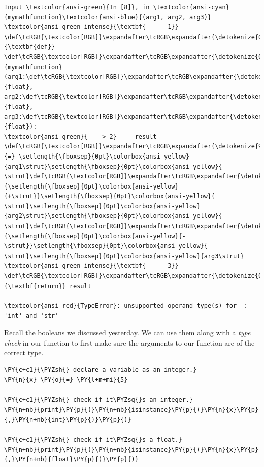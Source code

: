 \begin{Verbatim}[commandchars=\\\{\}, frame=single, framerule=2mm, rulecolor=\color{outerrorbackground}]
Input \textcolor{ansi-green}{In [8]}, in \textcolor{ansi-cyan}{mymathfunction}\textcolor{ansi-blue}{(arg1, arg2, arg3)}
\textcolor{ansi-green-intense}{\textbf{      1}} \def\tcRGB{\textcolor[RGB]}\expandafter\tcRGB\expandafter{\detokenize{0,135,0}}{\textbf{def}} \def\tcRGB{\textcolor[RGB]}\expandafter\tcRGB\expandafter{\detokenize{0,0,255}}{mymathfunction}(arg1:\def\tcRGB{\textcolor[RGB]}\expandafter\tcRGB\expandafter{\detokenize{0,135,0}}{float}, arg2:\def\tcRGB{\textcolor[RGB]}\expandafter\tcRGB\expandafter{\detokenize{0,135,0}}{float}, arg3:\def\tcRGB{\textcolor[RGB]}\expandafter\tcRGB\expandafter{\detokenize{0,135,0}}{float}):
\textcolor{ansi-green}{----> 2}     result \def\tcRGB{\textcolor[RGB]}\expandafter\tcRGB\expandafter{\detokenize{98,98,98}}{=} \setlength{\fboxsep}{0pt}\colorbox{ansi-yellow}{arg1\strut}\setlength{\fboxsep}{0pt}\colorbox{ansi-yellow}{ \strut}\def\tcRGB{\textcolor[RGB]}\expandafter\tcRGB\expandafter{\detokenize{98,98,98}}{\setlength{\fboxsep}{0pt}\colorbox{ansi-yellow}{+\strut}}\setlength{\fboxsep}{0pt}\colorbox{ansi-yellow}{ \strut}\setlength{\fboxsep}{0pt}\colorbox{ansi-yellow}{arg2\strut}\setlength{\fboxsep}{0pt}\colorbox{ansi-yellow}{ \strut}\def\tcRGB{\textcolor[RGB]}\expandafter\tcRGB\expandafter{\detokenize{98,98,98}}{\setlength{\fboxsep}{0pt}\colorbox{ansi-yellow}{-\strut}}\setlength{\fboxsep}{0pt}\colorbox{ansi-yellow}{ \strut}\setlength{\fboxsep}{0pt}\colorbox{ansi-yellow}{arg3\strut}
\textcolor{ansi-green-intense}{\textbf{      3}}     \def\tcRGB{\textcolor[RGB]}\expandafter\tcRGB\expandafter{\detokenize{0,135,0}}{\textbf{return}} result

\textcolor{ansi-red}{TypeError}: unsupported operand type(s) for -: 'int' and 'str'
    \end{Verbatim}

    Recall the booleans we discussed yesterday. We can use them along with a
\emph{type check} in our function to first make sure the arguments to
our function are of the correct type.

    \begin{tcolorbox}[breakable, size=fbox, boxrule=1pt, pad at break*=1mm,colback=cellbackground, colframe=cellborder]
\begin{Verbatim}[commandchars=\\\{\}]
\PY{c+c1}{\PYZsh{} declare a variable as an integer.}
\PY{n}{x} \PY{o}{=} \PY{l+m+mi}{5}

\PY{c+c1}{\PYZsh{} check if it\PYZsq{}s an integer.}
\PY{n+nb}{print}\PY{p}{(}\PY{n+nb}{isinstance}\PY{p}{(}\PY{n}{x}\PY{p}{,}\PY{n+nb}{int}\PY{p}{)}\PY{p}{)}

\PY{c+c1}{\PYZsh{} check if it\PYZsq{}s a float.}
\PY{n+nb}{print}\PY{p}{(}\PY{n+nb}{isinstance}\PY{p}{(}\PY{n}{x}\PY{p}{,}\PY{n+nb}{float}\PY{p}{)}\PY{p}{)}
\end{Verbatim}
\end{tcolorbox}

